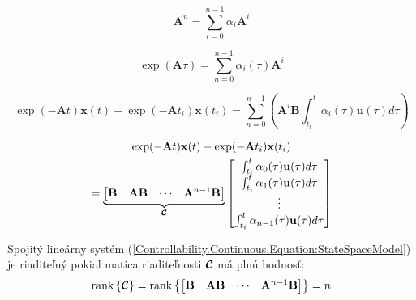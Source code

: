 \documentclass[a4paper, 10pt, ]{article}
\begin{document}
\begin{equation}
    \bm{A}^n = \sum_{i = 0}^{n - 1} \alpha_{i} \bm{A}^{i}
\end{equation}

\begin{equation}
    \exp(\bm{A} \tau) = \sum_{n = 0}^{n - 1} \alpha_i(\tau) \bm{A}^{i}
\end{equation}

\begin{equation}
    \exp(-\bm{A} t) \bm{x}(t) - \exp(-\bm{A} t_i) \bm{x}(t_i) = \sum_{n = 0}^{n - 1} \left( \bm{A}^{i} \bm{B} \int_{t_i}^{t} \alpha_i(\tau) \bm{u}(\tau) d\tau \right)
\end{equation}

\begin{multline}
    \exp(-\mathbf{A} t) \mathbf{x}(t) - \exp(-\mathbf{A} t_i) \mathbf{x}(t_i) \\ = 
    \underbrace{
        \begin{bmatrix}
            \mathbf{B} & \mathbf{A}\mathbf{B} & \cdots & \mathbf{A}^{n - 1} \mathbf{B}
        \end{bmatrix}
    }_{\boldsymbol{\mathcal{C}}}
    \begin{bmatrix}
        \int_{t_i}^{t} \alpha_0(\tau) \mathbf{u}(\tau) d\tau       \\
        \int_{t_i}^{t} \alpha_1(\tau) \mathbf{u}(\tau) d\tau       \\
        \vdots                                                 \\
        \int_{t_i}^{t} \alpha_{n - 1}(\tau) \mathbf{u}(\tau) d\tau \\
    \end{bmatrix}
\end{multline}

\begin{theorem}
    Spojitý lineárny systém (\ref{Controllability.Continuous.Equation:StateSpaceModel}) je riaditeľný pokiaľ matica riaditeľnosti $\boldsymbol{\mathcal{C}}$ má plnú hodnosť:
    \begin{equation}
        \label{Controllability.Continuous.Equation:ControllabilityTheorem}
        \mathrm{rank} \left\{ \boldsymbol{\mathcal{C}} \right\} = 
        \mathrm{rank} \left\{
            \begin{bmatrix}
                \mathbf{B} & \mathbf{A} \mathbf{B} & \cdots & \mathbf{A}^{n - 1} \mathbf{B}
            \end{bmatrix}
        \right\} = 
        n
    \end{equation}
\end{theorem}
\end{document}
